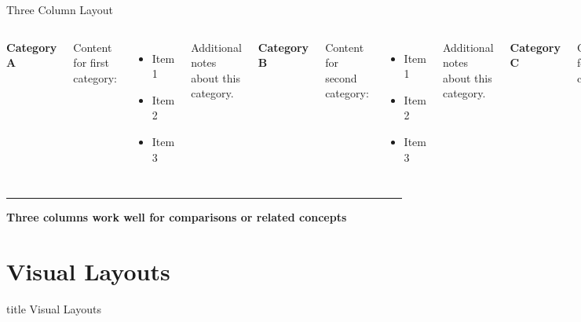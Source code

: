 \documentclass[8pt,aspectratio=169]{beamer}
\newcommand{\bottomnote}[1]{%
\vfill
\vspace{-2mm}
\textcolor{mllavender2}{\rule{\textwidth}{0.4pt}}
\vspace{1mm}
\footnotesize
\textbf{#1}
}
\begin{document}
\begin{frame}[t]{Three Column Layout}
\begin{columns}[T]
\textbf{Category A}

Content for first category:
\begin{itemize}
\item Item 1
\item Item 2
\item Item 3
\end{itemize}

Additional notes about this category.

\textbf{Category B}

Content for second category:
\begin{itemize}
\item Item 1
\item Item 2
\item Item 3
\end{itemize}

Additional notes about this category.

\textbf{Category C}

Content for third category:
\begin{itemize}
\item Item 1
\item Item 2
\item Item 3
\end{itemize}

Additional notes about this category.
\end{columns}

\bottomnote{Three columns work well for comparisons or related concepts}
\end{frame}

\section{Visual Layouts}

\begin{frame}[t]
\vfill
\centering
\begin{beamercolorbox}[sep=8pt,center]{title}
\Large Visual Layouts\par
\end{beamercolorbox}
\vfill
\end{frame}
\end{document}
